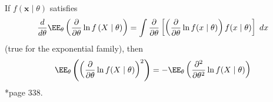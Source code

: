 \begin{lem} \label{lem: cri_helper}
    If $f(\bm{x} \mid \theta)$ satisfies
    \begin{equation*}
        \frac{d}{d \theta} \EE_{\theta} \left( \frac{\partial}{\partial \theta} \ln f \left( X \mid \theta \right) \right) = \int \frac{\partial}{\partial \theta} \left[ \left( \frac{\partial}{\partial \theta} \ln f (x \mid \theta) \right) f (x \mid \theta) \right] \; dx
    \end{equation*}
    (true for the exponential family), then
    \begin{equation*}
        \EE_{\theta} \left( \left( \frac{\partial}{\partial \theta} \ln f(X \mid \theta)  \right)^2 \right) = - \EE_{\theta} \left( \frac{\partial^2}{\partial \theta^2} \ln f(X \mid \theta) \right)
    \end{equation*}
    \cite{CasellaGeorge2001SI}*{page 338}.
\end{lem}


